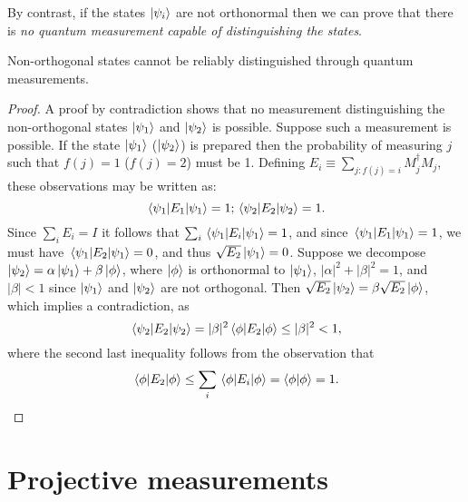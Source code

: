 By contrast, if the states $\ket{\psi_i}$ are not orthonormal then we can prove
that there is \emph{no quantum measurement capable of distinguishing the
states}.

\begin{theorem}
  Non-orthogonal states cannot be reliably distinguished through quantum
  measurements.
\end{theorem}

\begin{proof}
  A proof by contradiction shows that no measurement distinguishing the
  non-orthogonal states $\ket{\psi_1}$ and $\ket{\psi_2}$ is possible. Suppose
  such a measurement is possible. If the state $\ket{\psi_1}$ ($\ket{\psi_2}$)
  is prepared then the probability of measuring $j$ such that $f(j) = 1$ ($f(j)
  = 2$) must be 1. Defining $E_i \equiv \sum_{j: f(j) = i}M_j^\dagger M_j$,
  these observations may be written as: \begin{equation*}
    \mel{\psi_1}{E_1}{\psi_1} = 1; \mel{\psi_2}{E_2}{\psi_2} = 1.
  \end{equation*}
  Since $\sum_iE_i = I$ it follows that $\sum_i\mel{\psi_1}{E_i}{\psi_1} = 1$,
  and since $\mel{\psi_1}{E_1}{\psi_1} = 1$, we must have $\mel{\psi_1}{E_2}
  {\psi_1} = 0$, and thus $\sqrt{E_2}\ket{\psi_1} = 0$. Suppose we decompose
  $\ket{\psi_2} = \alpha\ket{\psi_1} + \beta\ket{\phi}$, where $\ket{\phi}$ is
  orthonormal to $\ket{\psi_1}$, $|\alpha|^2 + |\beta|^2 = 1$, and $|\beta| <
  1$ since $\ket{\psi_1}$ and $\ket{\psi_2}$ are not orthogonal. Then
  $\sqrt{E_2}\ket{\psi_2} = \beta\sqrt{E_2}\ket{\phi}$, which implies a
  contradiction, as \begin{equation*}
    \mel{\psi_2}{E_2}{\psi_2} = |\beta|^2\mel{\phi}{E_2}{\phi} \leq |\beta|^2
    < 1,
  \end{equation*} where the second last inequality follows from the observation
  that \begin{equation*}
    \mel{\phi}{E_2}{\phi} \leq \sum_i\mel{\phi}{E_i}{\phi} =
    \braket{\phi}{\phi} = 1.
  \end{equation*}
\end{proof}

\section{Projective measurements}

